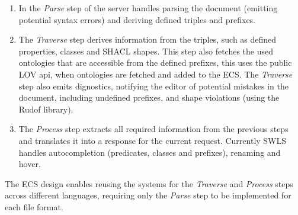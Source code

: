 \begin{enumerate}
  \item In the \textit{Parse} step of the server handles parsing the document (emitting potential syntax errors) and deriving defined triples and prefixes.

  \item The \textit{Traverse} step derives information from the triples, such as defined properties, classes and SHACL shapes. 
        This step also fetches the used ontologies that are accessible from the defined prefixes,
        this uses the public LOV api, when ontologies are fetched and added to the ECS.
        The \textit{Traverse} step also emits dignostics, notifying the editor of potential mistakes in the document, including undefined prefixes, and shape violations (using the Rudof\cite{labra2022rudof} library).

  \item The \textit{Process} step extracts all required information from the previous steps and translates it into a response for the current request.
        Currently SWLS handles autocompletion (predicates, classes and prefixes), renaming and hover.
\end{enumerate}
The ECS design enables reusing the systems for the \textit{Traverse} and \textit{Process} steps across different languages, 
requiring only the \textit{Parse} step to be implemented for each file format.


